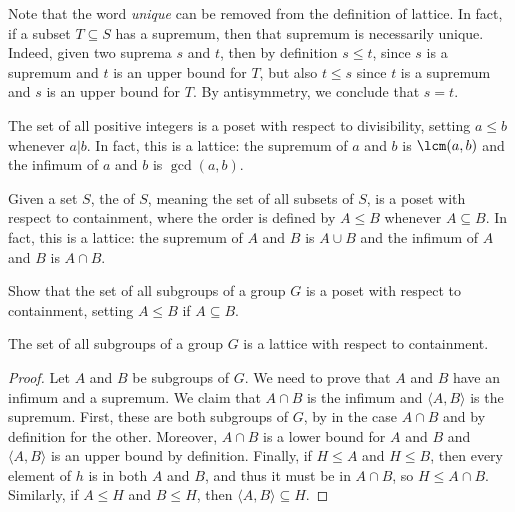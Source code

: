 \begin{remark}
	Note that the word \emph{unique} can be removed from the definition of lattice. In fact, if a subset $T \subseteq S$ has a supremum, then that supremum is necessarily unique. Indeed, given two suprema $s$ and $t$, then by definition $s \leq t$, since $s$ is a supremum and $t$ is an upper bound for $T$, but also $t \leq s$ since $t$ is a supremum and $s$ is an upper bound for $T$. By antisymmetry, we conclude that $s=t$.
\end{remark}



\begin{example}
The set of all positive integers is a poset with respect to divisibility, setting $a\leq b$ whenever $a|b$. In fact, this is a lattice: the supremum of $a$ and $b$ is $\lcm(a,b)$ and the infimum of $a$ and $b$ is $\gcd(a,b)$.
\end{example}


\begin{example}
Given a set $S$, the  of $S$, meaning the set of all subsets of $S$, is a poset with respect to containment, where the order is defined by $A\leq B$ whenever $A\subseteq B$. In fact, this is a lattice: the supremum of $A$ and $B$ is $A\cup B$ and the infimum of $A$ and $B$ is $A\cap B$.
\end{example}


\begin{exercise}
	Show that the set of all subgroups of a group $G$ is a poset with respect to containment, setting $A \leq B$ if $A \subseteq B$.
\end{exercise}

\begin{lemma}
	The set of all subgroups of a group $G$ is a lattice with respect to containment.
\end{lemma}


\begin{proof}
	Let $A$ and $B$ be subgroups of $G$. We need to prove that $A$ and $B$ have an infimum and a supremum. We claim that $A \cap B$ is the infimum and $\langle A, B \rangle$ is the supremum. First, these are both subgroups of $G$, by  in the case $A \cap B$ and by definition for the other. Moreover, $A \cap B$ is a lower bound for $A$ and $B$ and $\langle A, B \rangle$ is an upper bound by definition. Finally, if $H \leq A$ and $H \leq B$, then every element of $h$ is in both $A$ and $B$, and thus it must be in $A \cap B$, so $H \leq A \cap B$. Similarly, if $A \leq H$ and $B \leq H$, then $\langle A, B \rangle \subseteq H$.
\end{proof}


